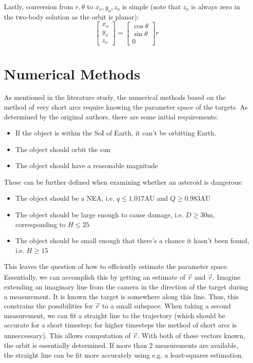 \documentclass[a4paper,10pt]{article}
\begin{document}
Lastly, conversion from $r, \theta$ to $x_o, y_o, z_o$ is simple (note that $z_o$ is always zero in the two-body solution as the orbit is planar):
\begin{equation}
 \begin{bmatrix}
  x_o \\ y_o \\ z_o
 \end{bmatrix}
 =
 \begin{bmatrix}
  \cos \theta \\ \sin \theta \\ 0
 \end{bmatrix}
 r
\end{equation}



\section{Numerical Methods}

As mentioned in the literature study, the numerical methods based on the method of very short arcs require knowing the parameter space of the targets. As determined by the original authors, there are some initial requirements:
\begin{itemize}
 \item If the object is within the SoI of Earth, it can't be orbitting Earth.
 \item The object should orbit the sun
 \item The object should have a reasonable magnitude
\end{itemize}
These can be further defined when examining whether an asteroid is dangerous:
\begin{itemize}
 \item The object should be a NEA, i.e. $q \leq 1.017\mathrm{AU}$ and $Q \geq 0.983\mathrm{AU}$
 \item The object should be large enough to cause damage, i.e. $D\geq30\mathrm{m}$, corresponding to $H \leq 25$
 \item The object should be small enough that there's a chance it hasn't been found, i.e. $H \geq 15$
\end{itemize}

This leaves the question of how to efficiently estimate the parameter space. Essentially, we can accomplish this by getting an estimate of $\vec{r}$ and $\dot{\vec{r}}$. Imagine extending an imaginary line from the camera in the direction of the target during a measurement. It is known the target is somewhere along this line. Thus, this constrains the possibilities for $\vec{r}$ to a small subspace. When taking a second measurement, we can fit a straight line to the trajectory (which should be accurate for a short timestep; for higher timesteps the method of short arcs is unneccessary). This allows computation of $\dot{\vec{r}}$. With both of these vectors known, the orbit is essentially determined. If more than 2 measurements are available, the straight line can be fit more accurately using e.g. a least-squares estimation.\\
\end{document}
